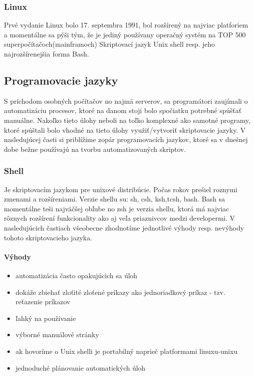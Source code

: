 \subsubsection{Linux}
\indent  Prvé vydanie Linux  bolo 17. septembra 1991, bol rozšírený na najviac platforiem a momentálne sa pýši tým, že je jediný používany operačný systém na TOP 500 superpočítačoch(mainframoch) Skriptovací jazyk Unix shell resp. jeho najrozšírenejšia forma Bash.
\newline
\subsection{Programovacie jazyky}
\indent S príchodom osobných počítačov no najmä serverov, sa programátori zaujímali o automatizáciu procesov, ktoré na danom stoji bolo spočiatku potrebné spúšťať manuálne. Nakoľko tieto úlohy neboli na toľko komplexné ako samotné programy, ktoré spúštali bolo vhodné na tieto úlohy využiť/vytvoriť skriptovacie jazyky. V nasledujúcej časti si priblížime zopár programovacích jazykov, ktoré sa v dnešnej dobe bežne používajú na tvorbu automatizovaných skriptov.

\subsubsection{Shell}
\indent
Je skriptovacím jazykom pre unixové distribúcie. Počas rokov prešiel roznymi zmenami a rozšíreniami. Verzie shellu su: sh, csh, ksh,tcsh, bash. Bash sa momentálne teši najväčšej obľube no zsh je verzia shellu, ktorá má najviac rôznych rozšírení funkcionality ako aj veľa priaznivcov medzi developermi. V nasledujúcich častiach všeobecne zhodnotíme jednotlivé výhody resp. nevýhody tohoto skriptovacieho jazyka.

\paragraph{Výhody}
\begin{itemize}
	\item automatizácia často opakujúcich sa úloh
	\item dokáže zbiehať zloťité zloťené príkazy ako jednoriadkový príkaz  - tzv. reťazenie príkazov
	\item ľahký na používanie
	\item výborné manuálové stránky
	\item ak hovoríme o Unix shelli je portabilný naprieč platformami linuxu-unixu
	\item jednoduché plánovanie automatických úloh
	\newline
\end{itemize}
